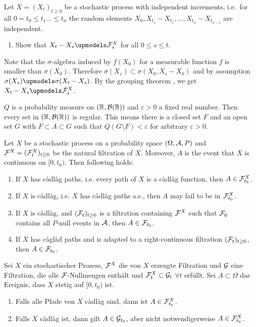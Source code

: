 
 Let $X = (X_t)_{t\geq 0}$ be
a stochastic process with independent increments, i.e.\ for all $0=t_{0}\leq t_1
\dots \leq t_n$ the random elements $X_0, X_{t_1}-X_{t_1},\dots
,X_{t_n}-X_{t_{n-1}}$ are independent.
\begin{enumerate}
    \item Show that $X_t -X_s \upmodels \cF_{s}^{X}$ for all $0\leq s\leq t$. 
\end{enumerate}

\solution Note that the $\sigma$-algebra induced by $f(X_0)$ for a
measurable function $f$ is smaller than $\sigma(X_0)$. Therefore $\sigma(X_s)
\subset \sigma(X_0, X_s-X_0)$ and by assumption $\sigma(X_s) \upmodels
\sigma(X_t-X_s)$. By the grouping theorem \cite[p. 51]{Kallenberg}, we get
$X_{t}-X_{s}\upmodels \cF_s^{X}$. 


 $Q$ is a probability
measure on $(\mathbb R, \mathcal B(\mathbb B))$ and $\varepsilon>0$ a fixed real number. Then
every set in $(\mathbb R, \mathcal B(\mathbb R))$ is regular. This means there is a closed set $F$
and an open set $G$ with $F\subset A \subset G$ such that $Q(G\setminus
F)<\varepsilon$ for arbitrary $\varepsilon>0$. 


 Let $X$ be a stochastic process
on a probability space $(\Omega, \mathcal A, P)$ and $\mathcal F^{X}=(\mathcal F^{X}_{t})_{t\geq 0}$
be the natural filtration of $X$. Moreover, $A$ is the event that $X$ is
continuous on $[0, t_0)$. Then following holds:
\begin{enumerate}
    \item If $X$ has c\`adl\`ag paths, i.e. every path of $X$ is a c\`adl\`ag
        function, then $A\in \mathcal F^{X}_{t_0}$. 

    \item If $X$ is c\`adl\`ag, i.e. $X$ has c\`adl\`ag paths a.s., then $A$
        may fail to be in $\mathcal F^{X}_{t_0}$.

    \item If $X$ is c\`adl\`ag, and $(\mathcal F_{t})_{t\geq 0}$ is a filtration
        containing $\mathcal F^{X}$ such that $\mathcal F_{0}$ contains all $P$-null events
        in $\mathcal A$, then $A\in \mathcal F_{t_0}$.

    \item If $X$ has c\`agl\`ad paths and is adapted to a right-continuous
        filtration $(\mathcal F_{t})_{t\geq 0}$, then $A\in \mathcal F_{t_{0}}$. 
\end{enumerate}

  Sei $X$ ein stochastischer
Prozess, $\mathcal F^{X}$ die von $X$ erzeugte Filtration und $\mathcal G$ eine Filtration,
die alle $\mathcal F$-Nullmengen enthält und $\mathcal F^{X}_t \subset \mathcal G_t$ $\forall t$
erfüllt.  Sei $A \subset \Omega$ das Ereignis, dass $X$ stetig auf $[0, t_0)$
ist. 
\begin{enumerate}
    \item Falls alle Pfade von $X$ c\`adl\`ag sind, dann ist $A \in \mathcal F^{X}_{t_0}$.
    \item Falls $X$ c\`adl\`ag ist, dann gilt $A \in \mathcal G_{t_0}$, aber nicht
        notwendigerweise $A \in \mathcal F^{X}_{t_0}$.
\end{enumerate}

